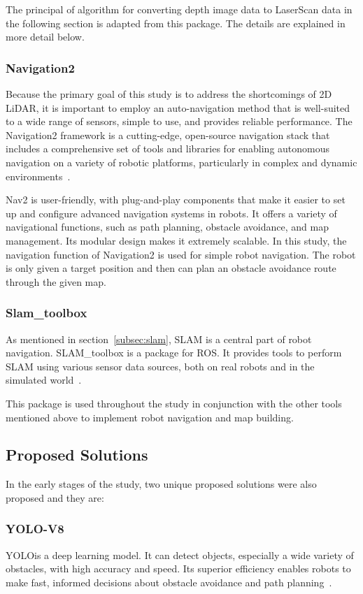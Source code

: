 The principal of algorithm for converting depth image data to LaserScan data in the following section is adapted from this package. 
The details are explained in more detail below.

\subsubsection{Navigation2}
Because the primary goal of this study is to address the shortcomings of 2D LiDAR, 
it is important to employ an auto-navigation method that is well-suited to a wide range of sensors, 
simple to use, and provides reliable performance.
The Navigation2 framework is a cutting-edge, 
open-source navigation stack that includes a comprehensive set of tools and libraries 
for enabling autonomous navigation on a variety of robotic platforms, particularly in complex and dynamic environments~\cite{nav2}. 

Nav2 is user-friendly, with plug-and-play components 
that make it easier to set up and configure advanced navigation systems in robots. 
It offers a variety of navigational functions, 
such as path planning, obstacle avoidance, and map management. Its modular design makes it extremely scalable. 
In this study, the navigation function of Navigation2 is used for simple robot navigation. 
The robot is only given a target position and then can plan an obstacle avoidance route through the given map.
\subsubsection{Slam\_toolbox}
As mentioned in section~\ref{subsec:slam}, SLAM is a central part of robot navigation. SLAM\_toolbox is a package for ROS. 
It provides tools to perform SLAM using various sensor data sources, both on real robots and in the simulated world~\cite{slamtoolbox}.

This package is used throughout the study in conjunction with the other tools mentioned above to implement robot navigation and map building.

\subsection{Proposed Solutions}
In the early stages of the study, two unique proposed solutions were also proposed and they are:
\subsubsection{YOLO-V8}
YOLOis a deep learning model. 
It can detect objects, especially a wide variety of obstacles, with high accuracy and speed. 
Its superior efficiency enables robots to make fast, informed decisions about obstacle avoidance and path planning~\cite{yolo}.

